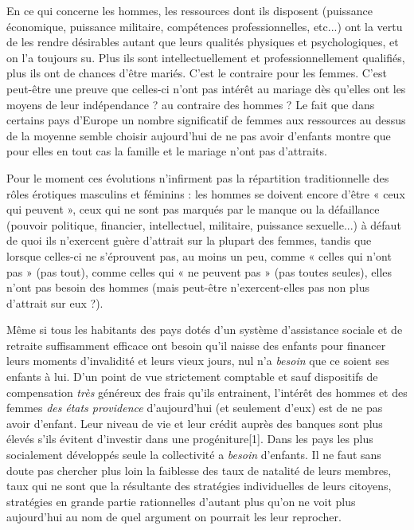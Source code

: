  En ce qui concerne les hommes, les ressources dont ils disposent (puissance économique, puissance militaire, compétences professionnelles, etc...) ont la vertu de les rendre désirables autant que leurs qualités physiques et psychologiques, et on l'a toujours su. Plus ils sont intellectuellement et professionnellement qualifiés, plus ils ont de chances d'être mariés. C'est le contraire pour les femmes. C'est peut-être une preuve que celles-ci n'ont pas intérêt au mariage dès qu'elles ont les moyens de leur indépendance ? au contraire des hommes ? Le fait que dans certains pays d'Europe un nombre significatif de femmes aux ressources au dessus de la moyenne semble choisir aujourd'hui de ne pas avoir d'enfants montre que pour elles en tout cas la famille et le mariage n'ont pas d'attraits. 
 
 Pour le moment ces évolutions n'infirment pas la répartition traditionnelle des rôles érotiques masculins et féminins : les hommes se doivent encore d'être « ceux qui peuvent », ceux qui ne sont pas marqués par le manque ou la défaillance (pouvoir politique, financier, intellectuel, militaire, puissance sexuelle...) à défaut de quoi ils n'exercent guère d'attrait sur la plupart des femmes, tandis que lorsque celles-ci ne s'éprouvent pas, au moins un peu, comme « celles qui n'ont pas » (pas tout), comme celles qui « ne peuvent pas » (pas toutes seules), elles n'ont pas besoin des hommes (mais peut-être n'exercent-elles pas non plus d'attrait sur eux ?).
 
 Même si tous les habitants des pays dotés d'un système d'assistance sociale et de retraite suffisamment efficace ont besoin qu'il naisse des enfants pour financer leurs moments d'invalidité et leurs vieux jours, nul n'a \emph{besoin} que ce soient ses enfants à lui. D'un point de vue strictement comptable et sauf dispositifs de compensation \emph{très}  généreux des frais qu'ils entrainent, l'intérêt des hommes et des femmes \emph{des} \emph{états providence} d'aujourd'hui (et seulement d'eux) est de ne pas avoir d'enfant. Leur niveau de vie et leur crédit auprès des banques sont plus élevés s'ils évitent d'investir dans une progéniture[1]. Dans les pays les plus socialement développés seule la collectivité a \emph{besoin} d'enfants. Il ne faut sans doute pas chercher plus loin la faiblesse des taux de natalité de leurs membres, taux qui ne sont que la résultante des stratégies individuelles de leurs citoyens, stratégies en grande partie rationnelles d'autant plus qu'on ne voit plus aujourd'hui au nom de quel argument on pourrait les leur reprocher. 
 
